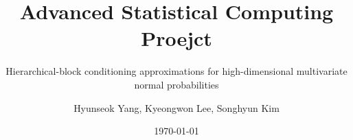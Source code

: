 \documentclass{scrartcl}
\begin{document}
\title{Advanced Statistical Computing Proejct}
\subtitle{Hierarchical-block conditioning approximations for high-dimensional multivariate normal probabilities}
\author{Hyunseok Yang, Kyeongwon Lee, Songhyun Kim}
\date{\today}
\maketitle










\end{document}
